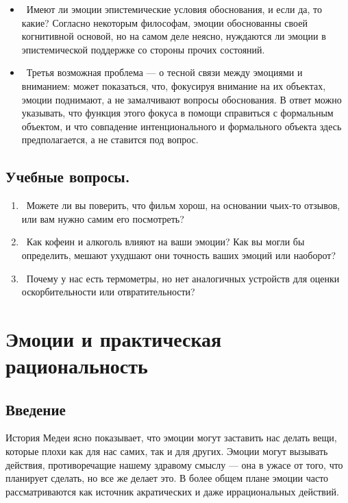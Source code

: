 \documentclass[11pt]{book}
\begin{document}
\begin{itemize}
  \item\ Имеют ли эмоции эпистемические условия обоснования, и если да, то какие? Согласно некоторым философам, эмоции обоснованны своей когнитивной основой, но на самом деле неясно, нуждаются ли эмоции в эпистемической поддержке со стороны прочих состояний.
  \item\ Третья возможная проблема --- о тесной связи между эмоциями и вниманием: может показаться, что, фокусируя внимание на их объектах, эмоции поднимают, а не замалчивают вопросы обоснования. В ответ можно указывать, что функция этого фокуса в помощи справиться с формальным объектом, и что совпадение интенционального и формального объекта здесь предполагается, а не ставится под вопрос.
\end{itemize}

\begin{tcolorbox}
  \section{Учебные вопросы.}
  \begin{enumerate}
    \item\ Можете ли вы поверить, что фильм хорош, на основании чьих-то отзывов, или вам нужно самим его посмотреть?
    \item\ Как кофеин и алкоголь влияют на ваши эмоции? Как вы могли бы определить, мешают ухудшают они точность ваших эмоций или наоборот?
    \item\ Почему у нас есть термометры, но нет аналогичных устройств для оценки оскорбительности или отвратительности?
  \end{enumerate}
\end{tcolorbox}

\chapter{Эмоции и практическая рациональность}

\section{Введение}

История Медеи ясно показывает, что эмоции могут заставить нас делать вещи, которые плохи как для нас самих, так и для других. Эмоции могут вызывать действия, противоречащие нашему здравому смыслу --- она в ужасе от того, что планирует сделать, но все же делает это. В более общем плане эмоции часто рассматриваются как источник акратических и даже иррациональных действий.
\end{document}
